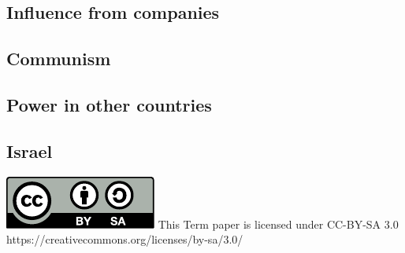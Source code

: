 \documentclass[12pt,a4paper]{article}
\begin{document}
		\subsection{Influence from companies}
		\subsection{Communism}
		\subsection{Power in other countries}
		\subsection{Israel}
		
		
	\newpage
	{
		{}
		
		\includegraphics{by-sa.pdf}
		This Term paper is licensed under CC-BY-SA 3.0\\
		https://creativecommons.org/licenses/by-sa/3.0/
	}
\end{document}
